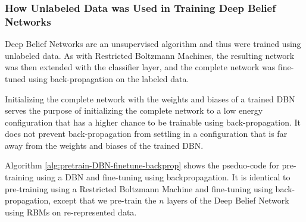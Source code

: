 \subsubsection{How Unlabeled Data was Used in Training Deep Belief Networks}

Deep Belief Networks are an unsupervised algorithm and thus were trained
using unlabeled data. As with Restricted Boltzmann Machines, the
resulting network was then extended with the classifier layer, and
the complete network was fine-tuned using back-propagation on the
labeled data.

Initializing the complete network with the weights and biases of a
trained DBN serves the purpose of initializing the complete network
to a low energy configuration that has a higher chance to be trainable
using back-propagation. It does not prevent back-propagation from
settling in a configuration that is far away from the weights and
biases of the trained DBN.

Algorithm \ref{alg:pretrain-DBN-finetune-backprop} shows the pseduo-code
for pre-training using a DBN and fine-tuning using backpropagation.
It is identical to pre-training using a Restricted Boltzmann Machine
and fine-tuning using back-propagation, except that we pre-train the
$n$ layers of the Deep Belief Network using RBMs on re-represented
data.

